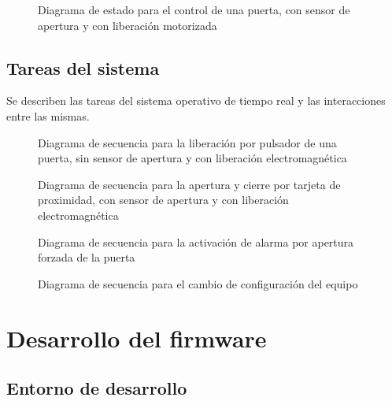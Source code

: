 \begin{figure}[ht]
	\centering
	\caption{Diagrama de estado para el control de una puerta, con sensor de apertura y con liberación motorizada}
	\label{fig:ControlConCon}
\end{figure}

\subsection{Tareas del sistema}

Se describen las tareas del sistema operativo de tiempo real y las interacciones entre las mismas.

\begin{figure}[ht]
	\centering
	\caption{Diagrama de secuencia para la liberación por pulsador de una puerta, sin sensor de apertura y con liberación electromagnética}
	\label{fig:SecuanciaPulsador}
\end{figure}

\begin{figure}[ht]
	\centering
	\caption{Diagrama de secuencia para la apertura y cierre por tarjeta de proximidad, con sensor de apertura y con liberación electromagnética}
	\label{fig:SecuenciaTarjeta}
\end{figure}

\begin{figure}[ht]
	\centering
	\caption{Diagrama de secuencia para la activación de alarma por apertura forzada de la puerta}
	\label{fig:SecuenciaForzada}
\end{figure}

\begin{figure}[ht]
	\centering
	\caption{Diagrama de secuencia para el cambio de configuración del equipo}
	\label{fig:SecuenciaConfiguracion}
\end{figure}

\section{Desarrollo del firmware}
\label{sec:desarrollo}

\subsection{Entorno de desarrollo}

